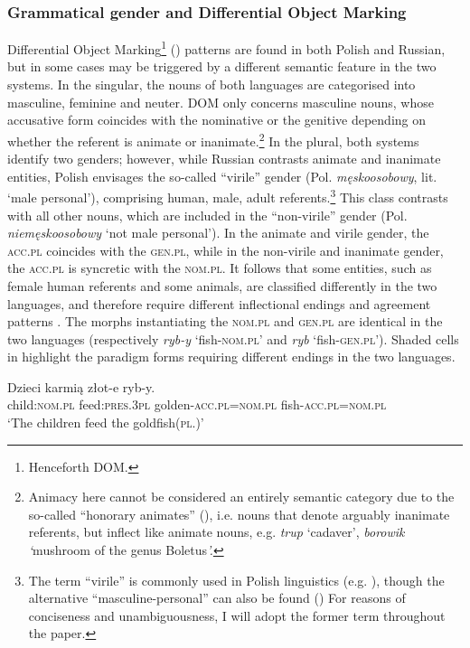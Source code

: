 \documentclass[output=paper,            colorlinks, citecolor=brown            		  ]{langscibook}
\begin{document}
\subsubsection{Grammatical gender and Differential Object Marking}
\label{sec:saturno:2.2.2}
Differential Object Marking\footnote{{Henceforth DOM.}} (\citealt{Bossong1998, Aissen2003}) patterns are found in both Polish and Russian, but in some cases may be triggered by a different semantic feature in the two systems. In the singular, the nouns of both languages are categorised into masculine, feminine and neuter. DOM only concerns masculine nouns, whose accusative form coincides with the nominative or the genitive depending on whether the referent is animate or inanimate.\footnote{{Animacy here cannot be considered an entirely semantic category due to the so-called “honorary animates”} {(\citealt[138]{SussexCubberley2006})}{, i.e. nouns that denote arguably inanimate referents, but inflect like animate nouns, e.g.} {\textit{trup}} {‘cadaver’,} {\textit{borowik ‘}}{mushroom of the genus Boletus}{\textit{’.}}} In the plural, both systems identify two genders; however, while Russian contrasts animate and inanimate entities, Polish envisages the so-called “virile” gender (Pol. \textit{męskoosobowy}, lit. ‘male personal’), comprising human, male, adult referents.\footnote{The term “virile” is commonly used in Polish linguistics {(e.g. \citealt{Brown1998, Janda1999})}{, though the alternative “masculine-personal” can also be found} {(\citealt{Rothstein2002, SussexCubberley2006})}{ For reasons of conciseness and unambiguousness, I will adopt the former term throughout the paper.}} This class contrasts with all other nouns, which are included in the “non-virile” gender (Pol. \textit{niemęskoosobowy} ‘not male personal’). In the animate and virile gender, the \textsc{acc.pl} coincides with the \textsc{gen.pl}, while in the non-virile and inanimate gender, the \textsc{acc.pl} is syncretic with the \textsc{nom.pl}. It follows that some entities, such as female human referents and some animals, are classified differently in the two languages, and therefore require different inflectional endings and agreement patterns . The morphs instantiating the \textsc{nom.pl} and \textsc{gen.pl} are identical in the two languages (respectively \textit{ryb-y} ‘fish-\textsc{nom.pl}’ and \textit{ryb} ‘fish-\textsc{gen.pl}’). Shaded cells in  highlight the paradigm forms requiring different endings in the two languages.  

\ea\label{ex:saturno:5}
    \ea\label{ex:saturno:5a}
    \gll Dzieci     karmią     złot-e        ryb-y.\\
    {child:\textsc{nom.pl}}  {feed:\textsc{pres.3pl}}  {golden-\textsc{acc.pl=nom.pl}}  {fish-\textsc{acc.pl=nom.pl}}\\ 
   \glt ‘The children feed the goldfish(\textsc{pl}.)’
\end{document}
